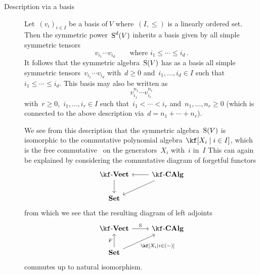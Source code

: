 \begin{recall}
\begin{description}
    \item[Description via a basis]
      Let~$(v_i)_{i \in I}$ be a basis of$~V$ where~$(I, \leq)$ is a linearly ordered set.
      Then the symmetric power~$\operatorname{S}^d(V)$ inherits a basis given by all simple symmetric tensors
      \[
        v_{i_1} \dotsm v_{i_d}
        \qquad
        \text{where~$i_1 \leq \dotsb \leq i_d$} \,.
      \]
      It follows that the symmetric algebra~$\operatorname{S}(V)$ has as a basis all simple symmetric tensors~$v_{i_1} \dotsm v_{i_d}$ with~$d \geq 0$ and~$i_1, \dotsc, i_d \in I$ such that~$i_1 \leq \dotsb \leq i_d$.
      This basis may also be written as
      \[
        v_{i_1}^{n_1} \dotsm v_{i_r}^{n_r}
      \]
      with~$r \geq 0$,~$i_1, \dotsc, i_r \in I$ such that~$i_1 < \dotsb < i_r$ and~$n_1, \dotsc, n_r \geq 0$ (which is connected to the above description via~$d = n_1 + \dotsb + n_r$).
      
      We see from this description that the symmetric algebra~$\operatorname{S}(V)$ is isomorphic to the commutative polynomial algebra~$\kf[X_i \suchthat i \in I]$, which is the free commutative~{\algebra{$\kf$}} on the generators~$X_i$ with~$i$ in~$I$
      This can again be explained by considering the commutative diagram of forgetful functors
      \[
        \begin{tikzcd}
          \cVect{\kf}
          \arrow{d}
          &
          \cCAlg{\kf}
          \arrow{l}
          \arrow{dl}
          \\
          \cSet
          &
          {}
        \end{tikzcd}
      \]
      from which we see that the resulting diagram of left adjoints
      \[
        \begin{tikzcd}
          \cVect{\kf}
          \arrow{r}[above]{\Symm}
          &
          \cCAlg{\kf}
          \\
          \cSet
          \arrow{u}[left]{F}
          \arrow{ur}[below right]{\kf[X_i \suchthat i \in (-)]}
          &
          {}
        \end{tikzcd}
      \]
      commutes up to natural isomorphism.
      

\end{description}
\end{recall}
